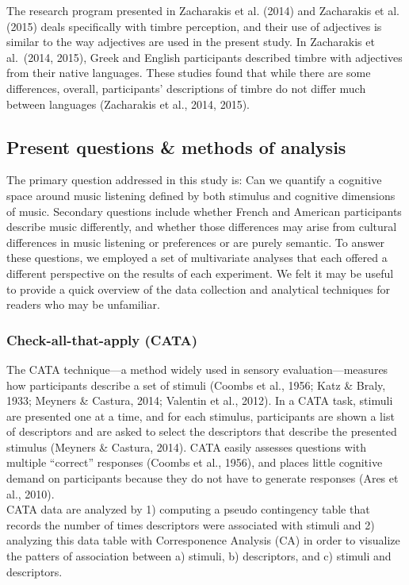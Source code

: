 \documentclass[
  english,
  man,floatsintext]{apa6}
\begin{document}
The research program presented in Zacharakis et al. (2014) and Zacharakis et al. (2015) deals specifically with timbre perception, and their use of adjectives is similar to the way adjectives are used in the present study. In Zacharakis et al.~(2014, 2015), Greek and English participants described timbre with adjectives from their native languages. These studies found that while there are some differences, overall, participants' descriptions of timbre do not differ much between languages (Zacharakis et al., 2014, 2015).

\hypertarget{present-questions-methods-of-analysis}{%
\subsection{Present questions \& methods of analysis}\label{present-questions-methods-of-analysis}}

The primary question addressed in this study is: Can we quantify a cognitive space around music listening defined by both stimulus and cognitive dimensions of music. Secondary questions include whether French and American participants describe music differently, and whether those differences may arise from cultural differences in music listening or preferences or are purely semantic. To answer these questions, we employed a set of multivariate analyses that each offered a different perspective on the results of each experiment. We felt it may be useful to provide a quick overview of the data collection and analytical techniques for readers who may be unfamiliar.

\hypertarget{check-all-that-apply-cata}{%
\subsubsection{Check-all-that-apply (CATA)}\label{check-all-that-apply-cata}}

The CATA technique---a method widely used in sensory evaluation---measures how participants describe a set of stimuli (Coombs et al., 1956; Katz \& Braly, 1933; Meyners \& Castura, 2014; Valentin et al., 2012). In a CATA task, stimuli are presented one at a time, and for each stimulus, participants are shown a list of descriptors and are asked to select the descriptors that describe the presented stimulus (Meyners \& Castura, 2014). CATA easily assesses questions with multiple ``correct'' responses (Coombs et al., 1956), and places little cognitive demand on participants because they do not have to generate responses (Ares et al., 2010).\\
CATA data are analyzed by 1) computing a pseudo contingency table that records the number of times descriptors were associated with stimuli and 2) analyzing this data table with Corresponence Analysis (CA) in order to visualize the patters of association between a) stimuli, b) descriptors, and c) stimuli and descriptors.
\end{document}
